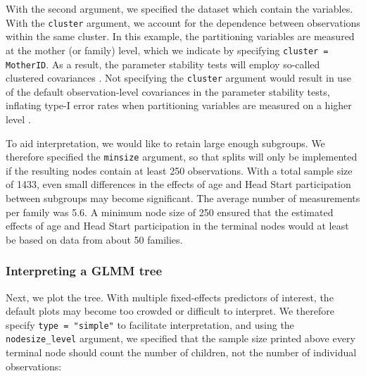 \documentclass[doc,floatsintext,natbib]{apa7}
\begin{document}
With the second argument, we specified the dataset which contain the variables. With the \texttt{cluster} argument, we account for the dependence between observations within the same cluster. In this example, the partitioning variables are measured at the mother (or family) level, which we indicate by specifying \texttt{cluster = MotherID}. As a result, the parameter stability tests will employ so-called clustered covariances \citep{ZeilyKoll20}. Not specifying the \texttt{cluster} argument would result in use of the default observation-level covariances in the parameter stability tests, inflating type-I error rates when partitioning variables are measured on a higher level \citep{FokkyZeil24}. 
 

To aid interpretation, we would like to retain large enough subgroups. We therefore specified the \texttt{minsize} argument, so that splits will only be implemented if the resulting nodes contain at least 250 observations. With a total sample size of 1433, even small differences in the effects of age and Head Start participation between subgroups may become significant. The average number of measurements per family was 5.6. A minimum node size of 250 ensured that the estimated effects of age and Head Start participation in the terminal nodes would at least be based on data from about 50 families.


\subsubsection{Interpreting a GLMM tree}

Next, we plot the tree. With multiple fixed-effects predictors of interest, the default plots may become too crowded or difficult to interpret. We therefore specify \verb|type = "simple"| to facilitate interpretation, and using the \verb|nodesize_level| argument, we specified that the sample size printed above every terminal node should count the number of children, not the number of individual observations:
\end{document}
